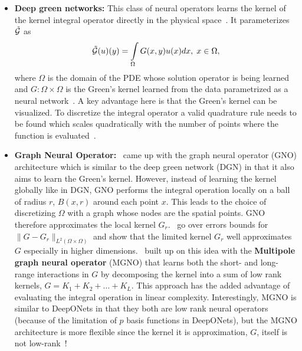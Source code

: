 \begin{itemize}
\item {\bf Deep green networks:} This class of neural operators learns the kernel of the kernel integral operator directly in the physical space~\citep{gin2021deepgreen, boulle2022data}. It parameterizes $\tilde{\mathcal{G}}$ as
\begin{align}
\tilde{\mathcal{G}}(u)(y) = \int\limits_{\Omega} G(x, y) u(x) dx, \; x \in \Omega,
\end{align}
where $\Omega$ is the domain of the PDE whose solution operator is being learned and $G: \Omega \times \Omega$ is the Green's kernel learned from the data parametrized as a neural network~\citep{boulle2022data}. A key advantage here is that the Green's kernel can be visualized. To discretize the integral operator a valid quadrature rule needs to be found which scales quadratically with the number of points where the function is evaluated~\citep{boulle2024mathematical}.

\item {\bf Graph Neural Operator:}~\citep{li2020neural} came up with the graph neural operator (GNO) architecture which is similar to the deep green network (DGN) in that it also aims to learn the Green's kernel. However, instead of learning the kernel globally like in DGN, GNO performs the integral operation locally on a ball of radius $r$, $B(x, r)$ around each point $x$. This leads to the choice of discretizing $\Omega$ with a graph whose nodes are the spatial points. GNO therefore approximates the local kernel $G_r$.~\citep{li2020neural} go over errors bounds for $\|G - G_r\|_{L^2(\Omega \times \Omega)}$ and show that the limited kernel $G_r$ well approximates $G$ especially in higher dimensions.~\citep{li2020multipole} built up on this idea with the {\bf Multipole graph neural operator} (MGNO) that learns both the short- and long-range interactions in $G$ by decomposing the kernel into a sum of low rank kernels, $G = K_1 + K_2 + \dots + K_L$. This approach has the added advantage of evaluating the integral operation in linear complexity. Interestingly, MGNO is similar to DeepONets in that they both are low rank neural operators (because of the limitation of $p$ basis functions in DeepONets), but the MGNO architecture is more flexible since the kernel it is approximation, $G$, itself is not low-rank~\citep{boulle2024mathematical}!


\end{itemize}
